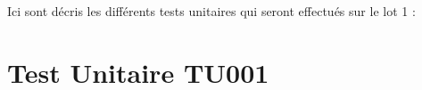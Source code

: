 
Ici sont décris les différents tests unitaires qui seront effectués sur le lot 1 :

\section{Test Unitaire TU001}
%	
%		
%		
%	
